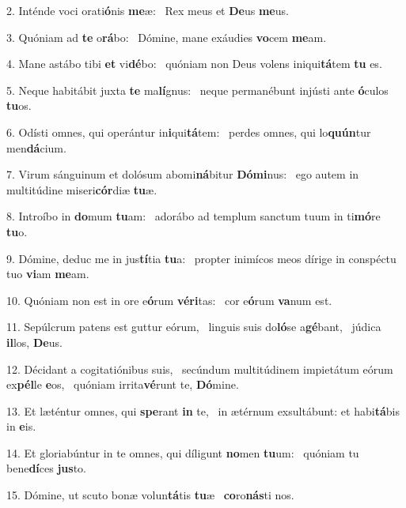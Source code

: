 2. Inténde voci orati\textbf{ó}nis \textbf{me}æ: \ast\  Rex meus et \textbf{De}us \textbf{me}us.\

3. Quóniam ad \textbf{te} o\textbf{rá}bo: \ast\  Dómine, mane exáudies \textbf{vo}cem \textbf{me}am.\

4. Mane astábo tibi \textbf{et} vi\textbf{dé}bo: \ast\  quóniam non Deus volens iniqui\textbf{tá}tem \textbf{tu} es.\

5. Neque habitábit juxta \textbf{te} ma\textbf{lí}gnus: \ast\  neque permanébunt injústi ante \textbf{ó}culos \textbf{tu}os.\

6. Odísti omnes, qui operántur in\textbf{i}qui\textbf{tá}tem: \ast\  perdes omnes, qui lo\textbf{quún}tur men\textbf{dá}cium.\

7. Virum sánguinum et dolósum abomi\textbf{ná}bitur \textbf{Dó}\textbf{mi}nus: \ast\  ego autem in multitúdine miseri\textbf{cór}diæ \textbf{tu}æ.\

8. Introíbo in \textbf{do}mum \textbf{tu}am: \ast\  adorábo ad templum sanctum tuum in ti\textbf{mó}re \textbf{tu}o.\

9. Dómine, deduc me in jus\textbf{tí}tia \textbf{tu}a: \ast\  propter inimícos meos dírige in conspéctu tuo \textbf{vi}am \textbf{me}am.\

10. Quóniam non est in ore e\textbf{ó}rum \textbf{vé}\textbf{ri}tas: \ast\  cor e\textbf{ó}rum \textbf{va}num est.\

11. Sepúlcrum patens est guttur eórum, \dag\  linguis suis do\textbf{ló}se a\textbf{gé}bant, \ast\  júdica \textbf{il}los, \textbf{De}us.\

12. Décidant a cogitatiónibus suis, \dag\  secúndum multitúdinem impietátum eórum ex\textbf{pél}le \textbf{e}os, \ast\  quóniam irrita\textbf{vé}runt te, \textbf{Dó}mine.\

13. Et læténtur omnes, qui \textbf{spe}rant \textbf{in} te, \ast\  in ætérnum exsultábunt: et habi\textbf{tá}bis in \textbf{e}is.\

14. Et gloriabúntur in te omnes, qui díligunt \textbf{no}men \textbf{tu}um: \ast\  quóniam tu bene\textbf{dí}ces \textbf{jus}to.\

15. Dómine, ut scuto bonæ volun\textbf{tá}tis \textbf{tu}æ \ast\  \textbf{co}ro\textbf{nás}ti nos.\


